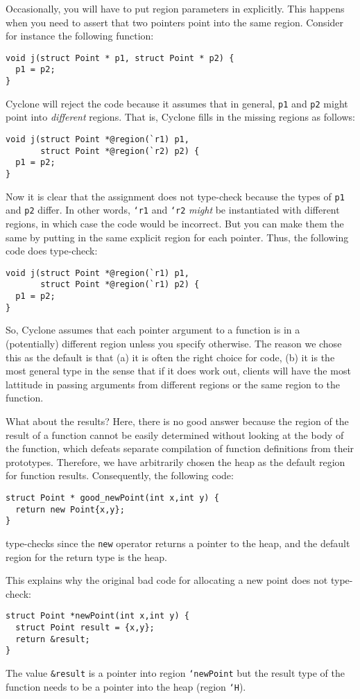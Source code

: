 Occasionally, you will have to put region parameters in explicitly.
This happens when you need to assert that two pointers point into 
the same region.  Consider for instance the following function:
\begin{verbatim}
void j(struct Point * p1, struct Point * p2) {
  p1 = p2;
}
\end{verbatim}
Cyclone will reject the code because it assumes that in general,
\texttt{p1} and \texttt{p2} might point into \emph{different} regions.
That is, Cyclone fills in the missing regions as follows:
\begin{verbatim}
void j(struct Point *@region(`r1) p1, 
       struct Point *@region(`r2) p2) {
  p1 = p2;
}
\end{verbatim}
Now it is clear that the assignment does not type-check because
the types of \texttt{p1} and \texttt{p2} differ.  In other words,
\texttt{`r1} and \texttt{`r2} \emph{might} be instantiated with
different regions, in which case the code would be incorrect.
But you can make them the same by putting in the same explicit region
for each pointer.  Thus, the following code does type-check:
\begin{verbatim}
void j(struct Point *@region(`r1) p1, 
       struct Point *@region(`r1) p2) {
  p1 = p2;
}
\end{verbatim}

So, Cyclone assumes that each pointer argument to a function is
in a (potentially) different region unless you specify otherwise.
The reason we chose this as the default is that (a) it is often
the right choice for code, (b) it is the most general type in
the sense that if it does work out, clients will have the most
lattitude in passing arguments from different regions or the
same region to the function.  

What about the results?  Here, there is no good answer because
the region of the result of a function cannot be easily determined
without looking at the body of the function, which defeats separate
compilation of function definitions from their prototypes.  Therefore,
we have arbitrarily chosen the heap as the default region for
function results.  Consequently, the following code:
\begin{verbatim}
struct Point * good_newPoint(int x,int y) {
  return new Point{x,y};
}
\end{verbatim}
type-checks since the \texttt{new} operator returns a pointer
to the heap, and the default region for the return type is the heap.

This explains why the original bad code for allocating a new
point does not type-check:
\begin{verbatim}
struct Point *newPoint(int x,int y) {
  struct Point result = {x,y};
  return &result;
}
\end{verbatim}
The value \texttt{\&result} is a pointer into region \texttt{`newPoint}
but the result type of the function needs to be a pointer into
the heap (region \texttt{`H}).  

